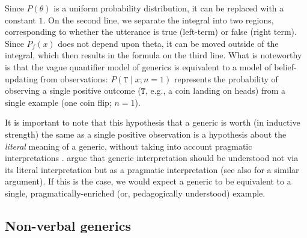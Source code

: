 \documentclass[10pt,letterpaper]{article}
\begin{document}
Since $P(\theta)$ is a uniform probability distribution, it can be replaced with a constant $1$. On the second line, we separate the integral into two regions, corresponding to whether the utterance is true (left-term) or false (right term).
Since $P_f(x)$ does not depend upon theta, it can be moved outside of the integral, which then results in the formula on the third line. 
What is noteworthy is that the vague quantifier model of generics is equivalent to a model of belief-updating from observations: $P(\texttt{T} \mid x; n=1)$ represents the probability of observing a single positive outcome ($\texttt{T}$, e.g., a coin landing on heads) from a single example (one coin flip; $n=1$). 

It is important to note that this hypothesis that a generic is worth (in inductive strength) the same as a single positive observation is a hypothesis about the \emph{literal} meaning of a generic, without taking into account pragmatic interpretations \cite{grice1975logic}. %
 argue that generic interpretation should be understood not via its literal interpretation but as a pragmatic interpretation (see also  for a similar argument). 
If this is the case, we would expect a generic to be equivalent to a single, pragmatically-enriched (or, pedagogically understood) example. 



\subsection{Non-verbal generics}
\end{document}
